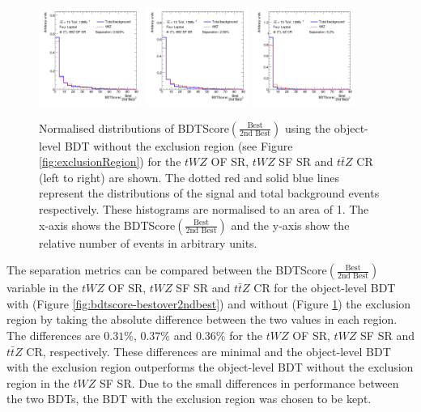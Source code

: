 \begin{figure}[h!]
    \centering
    \includegraphics[width=0.3\textwidth]{figures/bdtPlots/lep4_tWZ_4T_OF_BDT_Score_bestOver2ndBest_sep.png}
    \includegraphics[width=0.3\textwidth]{figures/bdtPlots/lep4_tWZ_4T_SF_BDT_Score_bestOver2ndBest_sep.png}
    \includegraphics[width=0.3\textwidth]{figures/bdtPlots/lep4_ttZ_4T_BDT_Score_bestOver2ndBest_sep.png}
    \caption{Normalised distributions of BDTScore$(\frac{\text{Best}}{\text{2nd Best}})$ using the object-level BDT without the exclusion region (see Figure \ref{fig:exclusionRegion}) for the $tWZ$ OF SR, $tWZ$ SF SR and $t\bar{t}Z$ CR (left to right) are shown. The dotted red and solid blue lines represent the distributions of the signal and total background events respectively. These histograms are normalised to an area of 1. The x-axis shows the BDTScore$(\frac{\text{Best}}{\text{2nd Best}})$ and the y-axis show the relative number of events in arbitrary units.}
    \label{fig:exclusionRegion-normplots}
\end{figure}The separation metrics can be compared between the BDTScore$(\frac{\text{Best}}{\text{2nd Best}})$ variable in the $tWZ$ OF SR, $tWZ$ SF SR and $t\bar{t}Z$ CR for the object-level BDT with (Figure \ref{fig:bdtscore-bestover2ndbest}) and without (Figure \ref{fig:exclusionRegion-normplots}) the exclusion region by taking the absolute difference between the two values in each region. The differences are $0.31\%$, $0.37\%$ and $0.36\%$ for the $tWZ$ OF SR, $tWZ$ SF SR and $t\bar{t}Z$ CR, respectively. These differences are minimal and the object-level BDT with the exclusion region outperforms the object-level BDT without the exclusion region in the $tWZ$ SF SR. Due to the small differences in performance between the two BDTs, the BDT with the exclusion region was chosen to be kept.

